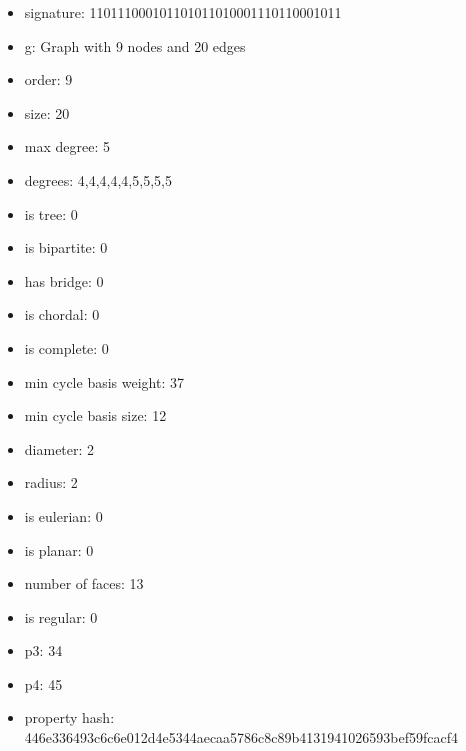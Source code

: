 \newpage
\begin{figure}
\end{figure}
\begin{itemize}
\item signature: 110111000101101011010001110110001011
\item g: Graph with 9 nodes and 20 edges
\item order: 9
\item size: 20
\item max degree: 5
\item degrees: 4,4,4,4,4,5,5,5,5
\item is tree: 0
\item is bipartite: 0
\item has bridge: 0
\item is chordal: 0
\item is complete: 0
\item min cycle basis weight: 37
\item min cycle basis size: 12
\item diameter: 2
\item radius: 2
\item is eulerian: 0
\item is planar: 0
\item number of faces: 13
\item is regular: 0
\item p3: 34
\item p4: 45
\item property hash: 446e336493c6c6e012d4e5344aecaa5786c8c89b4131941026593bef59fcacf4
\end{itemize}
